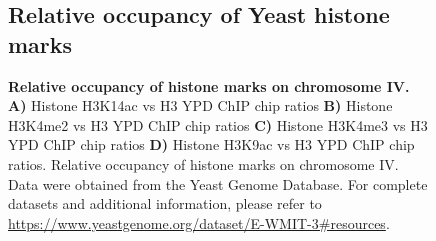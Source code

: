 \begin{figure}[hbt!]
\subsection{Relative occupancy of Yeast histone marks}
    \centering
    \renewcommand{\thesubfigure}{\Alph{subfigure}}
    \setcounter{subfigure}{0}
    \subfigtopskip=2pt
    \subfigbottomskip=2pt
    \subfigcapskip=-2pt

    \quad

    \vspace{0.5em}

    \quad

    \caption{\textbf{Relative occupancy of histone marks on chromosome IV.}
        \textbf{A)}  Histone H3K14ac vs H3 YPD ChIP chip ratios
        \textbf{B)}  Histone H3K4me2 vs H3 YPD ChIP chip ratios
        \textbf{C)}  Histone H3K4me3 vs H3 YPD ChIP chip ratios
        \textbf{D)}  Histone H3K9ac vs H3 YPD ChIP chip ratios. 
        Relative occupancy of histone marks on chromosome IV. Data were obtained from the Yeast Genome Database. For complete datasets and additional information, please refer to \url{https://www.yeastgenome.org/dataset/E-WMIT-3\#resources}.
    }
    \label{fig:histone_marks}
\end{figure}


